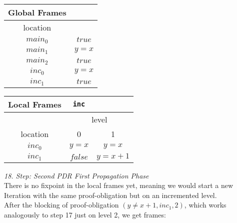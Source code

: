 \documentclass{article}
\begin{document}
	\begin{minipage}{.4\textwidth}
	\setlength\tabcolsep{0.35em}
	\begin{center}
		\begin{tabu}{cc}
			Global Frames \\
			\toprule
			location &  \\
			$main_0$ & $true$  \\
			$main_1$ & $y = x$\\
			$main_2$ & $true$ \\
			$inc_0$ & $y = x$  \\
			$inc_1$ & $true$\\
			\bottomrule
		\end{tabu}
	\end{center}
\end{minipage}
\hfill
\begin{minipage}{.5\textwidth}
	\setlength\tabcolsep{0.35em}
	\begin{center}
		\begin{tabu}{ccc}
			Local Frames & \texttt{inc}\\
			\toprule
			& \multicolumn{2}{c}{level} \\
			\cmidrule(lr){2-3}
			location & 0 & 1  \\
			\cmidrule{1-3}
			$inc_0$ & $y = x$ & $y = x$  \\
			$inc_1$ & $false$ & $y = x + 1$ \\
			\bottomrule
		\end{tabu}
	\end{center}	
\end{minipage}

\vspace*{2em}
\textsl{18. Step: Second PDR First Propagation Phase} \\
There is no fixpoint in the local frames yet, meaning we would start a new Iteration with the same proof-obligation but on an incremented level.\\
After the blocking of proof-obligation $(y \neq x + 1, inc_1, 2)$, which works analogously to step 17 just on level 2, we get frames: \\ \\ 
\end{document}

